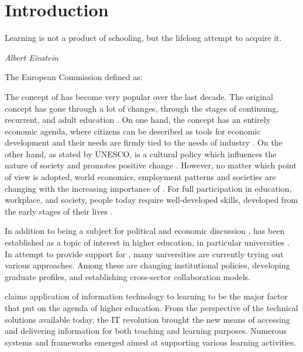 \chapter{Introduction\label{cha:intro}}
\epigraph{Learning is not a product of schooling, but the lifelong attempt to
acquire it.}{\textit{Albert Einstein}}
\noindent

The European Commission \citeyearpar{EuropeanCommission2000} defined \LLLs as:


The concept of \LLLs has become very popular over the last decade. The original
concept has gone through a lot of changes, through the stages of continuing,
recurrent, and adult education \citep{Jarvis2004}. On one hand, the \LLLs
concept has an entirely economic agenda, where citizens can be described
as tools for economic development and their needs are firmly tied to the needs
of industry \citep[pp.~112-114]{Carter2008}. On the other hand, as stated by
UNESCO, \LLLs is a cultural policy which influences the nature of society and
promotes positive change \citep[pp.~12-14]{Boshier2000}. However, no matter
which point of view is adopted, world economics, employment patterns and
societies are changing with the increasing importance of \LLLs
\citep{Jarvis2008,Simmons-McDonald2009}. For full participation in education,
workplace, and society, people today require well-developed \LLLs skills,
developed from the early stages of their lives \citep{Otala1997}.

In addition to being a subject for political and economic discussion
\citep{Bagnall2009}, \LLLs has been established as a topic of interest in
higher education, in particular universities \citep{Knapper2000}. In attempt to
provide support for \LLLsn, many universities are currently trying out various
approaches. Among these are changing institutional policies, developing graduate
profiles, and establishing cross-sector collaboration models.

\citet{Duke2001} claims application of information technology to learning to be
the major factor that put \LLLs on the agenda of higher education. From the
perspective of the technical solutions available today, the IT revolution
brought the new means of accessing and delivering information for both teaching
and learning purposes. Numerous systems and frameworks emerged aimed at
supporting various learning activities. 

